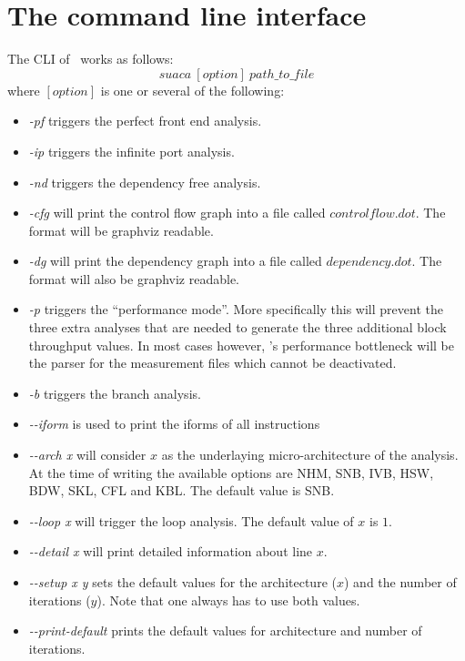 \section{The command line interface}
The CLI of \suaca\ works as follows:\\
\[
suaca\ [option]\ path\_to\_file
\]
where $[option]$ is one or several of the following:
\begin{itemize}
    \item \emph{-pf} triggers the perfect front end analysis.
    \item \emph{-ip} triggers the infinite port analysis.
    \item \emph{-nd} triggers the dependency free analysis. 
    \item \emph{-cfg} will print the control flow graph into a file called $controlflow.dot$. The format will be graphviz readable.
    \item \emph{-dg} will print the dependency graph into a file called $dependency.dot$. The format will also be graphviz readable.
    \item \emph{-p} triggers the ``performance mode''. More specifically this will prevent the three extra analyses that are needed to generate the three additional block throughput values. In most cases however, \suaca's performance bottleneck will be the parser for the measurement files which cannot be deactivated. 
    \item \emph{-b} triggers the branch analysis.
    \item \emph{-{}-iform} is used to print the iforms of all instructions
    \item \emph{-{}-arch x} will consider $x$ as the underlaying micro-architecture of the analysis. At the time of writing the available options are NHM, SNB, IVB, HSW, BDW, SKL, CFL and KBL. The default value is SNB.
    \item \emph{-{}-loop x} will trigger the loop analysis. The default value of $x$ is $1$.
    \item \emph{-{}-detail x} will print detailed information about line $x$.
     \item \emph{-{}-setup x y} sets the default values for the architecture ($x$) and the number of iterations ($y$). Note that one always has to use both values. 
    \item \emph{-{}-print-default} prints the default values for architecture and number of iterations.
\end{itemize}



